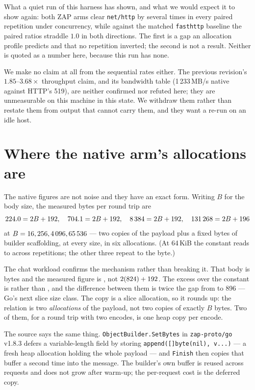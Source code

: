 \documentclass[11pt]{article}
\begin{document}
What a quiet run of this harness has shown, and what we would expect it to show
again: both ZAP arms clear \texttt{net/http} by several times in every paired
repetition under concurrency, while against the matched \texttt{fasthttp}
baseline the paired ratios straddle $1.0$ in both directions. The first is a
gap an allocation profile predicts and that no repetition inverted; the second
is not a result. Neither is quoted as a number here, because this run has none.
\fi

We make no claim at all from the sequential rates either. The previous revision's
$1.85$--$3.68\times$ throughput claim, and its bandwidth table (1\,233\,MB/s
native against HTTP's 519), are neither confirmed nor refuted here; they
are unmeasurable on this machine in this state. We withdraw them rather than
restate them from output that cannot carry them, and they want a re-run on an idle
host.

\section{Where the native arm's allocations are}
\label{sec:builder}

The native figures are not noise and they have an exact form. Writing $B$ for the
body size, the measured bytes per round trip are
\[
  224.0 = 2B + 192,\quad 704.1 = 2B + 192,\quad
  8\,384 = 2B + 192,\quad 131\,268 = 2B + 196
\]
at $B = 16, 256, 4\,096, 65\,536$ --- two copies of the
payload plus a fixed \natKTiny{} bytes of builder scaffolding, at every size, in
six allocations. (At 64\,KiB the constant reads \natKTiny{} to \natKLarge{} across
repetitions; the other three repeat to the byte.)

The chat workload confirms the mechanism rather than breaking it. That body is
\bodyChat{} bytes and the measured figure is \natChat, not $2(824) +
192$. The excess over the constant is \natKChat{} rather than \natKTiny,
and the difference between them is twice the gap from \bodyChat{} to 896 --- Go's
next slice size class. The copy is a slice allocation, so it rounds up: the
relation is two \emph{allocations} of the payload, not two copies of exactly $B$
bytes. Two of them, for a round trip with two encodes, is one heap copy per
encode.

The source says the same thing. \texttt{ObjectBuilder.SetBytes} in
\texttt{zap-proto/go} v1.8.3 defers a variable-length field by storing
\texttt{append([]byte(nil), v...)} --- a fresh heap allocation holding the whole
payload --- and \texttt{Finish} then copies that buffer a second time into the
message. The builder's own buffer is reused across requests and does not grow
after warm-up; the per-request cost is the deferred copy.
\end{document}
